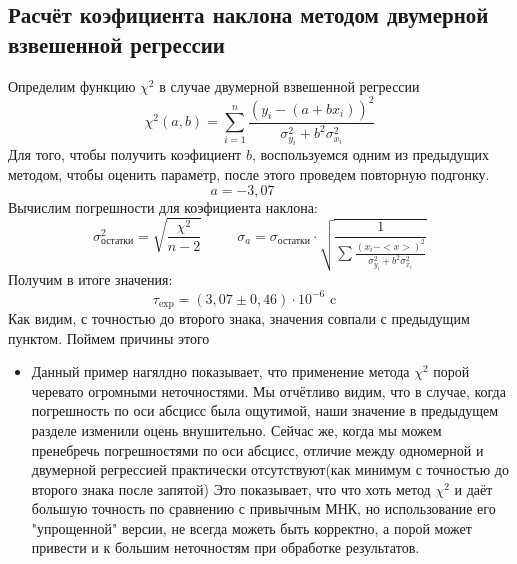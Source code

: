 \documentclass[a4paper,20pt]{article}
\theoremstyle{definition}
\begin{document}
\subsection{Расчёт коэфициента наклона методом двумерной взвешенной регрессии}
Определим функцию $\chi^2$ в случае двумерной взвешенной регрессии
\begin{equation}
	\chi^2(a, b) = \sum_{i=1}^{n} \frac{(y_i-(a+bx_i))^2}{\sigma^2_{y_i}+ b^2\sigma_{x_i}^2}
\end{equation}
Для того, чтобы получить коэфициент $b$, воспользуемся одним из предыдущих методом, чтобы оценить параметр, после этого проведем повторную подгонку.
\begin{equation}
	a = - 3,07 \;\;\;\;\;\;\;\;\; 
\end{equation}
Вычислим погрешности для коэфициента наклона:
\begin{equation}
	\sigma_{\text{остатки}}^2 = \sqrt{\frac{\chi^2}{n-2}} \;\;\;\;\;\;\;\;\; \sigma_a = \sigma_{\text{остатки}}\cdot \sqrt{\frac{1}{\sum \frac{(x_i-<x>)^2}{\sigma^2_{y_i}+ b^2\sigma_{x_i}^2}}}
\end{equation}
Получим в итоге значения:
\begin{equation}
	\tau_{\text{exp}} = (3,07 \pm 0,46 )\cdot10^{-6}  \text{     c} \;\;\;\;\;\;\;\; 
\end{equation}
Как видим, с точностью до второго знака, значения совпали с предыдущим пунктом. Поймем причины этого
\begin{itemize}
	\item Данный пример нагялдно показывает, что применение метода $\chi^2$ порой черевато огромными неточностями. Мы отчётливо видим,
что в случае, когда погрешность по оси абсцисс была ощутимой, наши значение в предыдущем разделе изменили оцень внушительно. Сейчас же, когда мы можем пренебречь погрешностями
по оси абсцисс, отличие между одномерной и двумерной регрессией практически отсутствуют(как минимум с точностью до второго знака после запятой)
Это показывает, что что хоть метод $\chi^2$ и даёт большую точность по сравнению с привычным МНК, но использование его "упрощенной" версии, не всегда можеть быть корректно, а порой 
может привести и к большим неточностям при обработке результатов.
\end{itemize}
\end{document}
